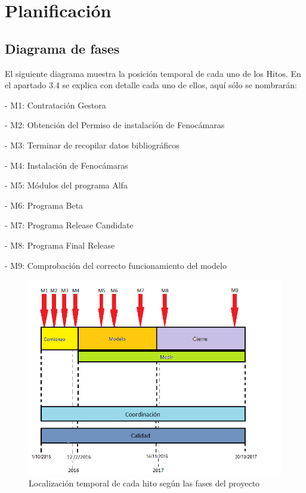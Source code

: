 \documentclass[12pt,oneside,a4paper]{article}
\numberwithin{figure}{section}
\begin{document}
\section{Planificación}

\subsection{Diagrama de fases}

El siguiente diagrama muestra la posición temporal de cada uno de los Hitos. En el apartado 3.4 se explica con detalle cada uno de ellos, aquí sólo se nombrarán:

\vspace{0.4cm}

- M1: Contratación Gestora

- M2: Obtención del Permiso de instalación de Fenocámaras

- M3: Terminar de recopilar datos bibliográficos

- M4: Instalación de Fenocámaras

- M5: Módulos del programa Alfa

- M6: Programa Beta

- M7: Programa Release Candidate

- M8: Programa Final Release

- M9: Comprobación del correcto funcionamiento del modelo

\begin{figure}[H]
\begin{center}
\includegraphics[scale=0.9]{Diagrama_de_Fases.png}
\caption{Localización temporal de cada hito según las fases del proyecto}
\label{fig:Hitos}
\end{center}
\end{figure}
\end{document}
